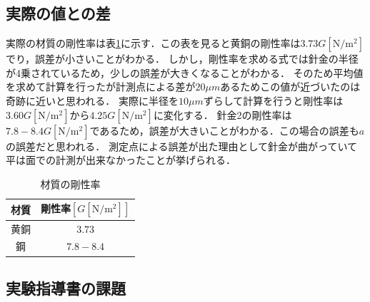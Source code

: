 \documentclass[a4paper,11pt]{ltjsarticle}
\begin{document}
\subsection{実際の値との差}
実際の材質の剛性率は表\ref{tab:material}に示す．この表を見ると黄銅の剛性率は$3.73G[\mathrm{N/m^2}]$でり，誤差が小さいことがわかる．
しかし，剛性率を求める式では針金の半径が4乗されているため，少しの誤差が大きくなることがわかる．
そのため平均値を求めて計算を行ったが計測点による差が$20μm$あるためこの値が近づいたのは奇跡に近いと思われる．
実際に半径を$10μm$ずらして計算を行うと剛性率は$3.60G[\mathrm{N/m^2}]$から$4.25G[\mathrm{N/m^2}]$に変化する．
針金2の剛性率は$7.8 - 8.4G[\mathrm{N/m^2}]$であるため，誤差が大きいことがわかる．この場合の誤差も$a$の誤差だと思われる．
測定点による誤差が出た理由として針金が曲がっていて平は面での計測が出来なかったことが挙げられる．
\begin{table}[H]
  \centering
  \caption{材質の剛性率}
  \label{tab:material}

  \begin{tabular}{c|c}
    \hline
    材質 & 剛性率$[G[\mathrm{N/m^2}]]$ \\
    \hline
    黄銅 & $3.73$                   \\
    \hline
    鋼  & $7.8 - 8.4$              \\
    \hline
  \end{tabular}
\end{table}
\subsection{実験指導書の課題}
\end{document}
